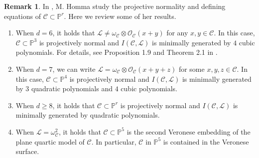 \documentclass[11pt,letterpaper,reqno]{amsart}
\theoremstyle{plain}
\theoremstyle{definition}
\newtheorem{remark}[theorem]{Remark}
\newtheorem{open problem}[theorem]{Open Problem}
\newtheorem{remark and notation}[theorem]{Remark and Notation}
\newtheorem{remark and definition}[theorem]{Remark and Definition}
\newtheorem{definition and notation}[theorem]{Definition and Notation}
\newtheorem{notation and convention}[theorem]{Notation and Convention}
\newtheorem{notation and remark}[theorem]{Notation and Remark}
\newtheorem{convention and notation}[theorem]{Convention and Notation}
\def \p {\mathbb{P}}
\begin{document}
\begin{remark}\label{rem:Homma's work}
In \cite{MR623440}, M. Homma study the projective normality and defining equations of $\mathcal{C} \subset \p^{r}$. Here we review some of her results.
\begin{enumerate}[\rm (1)]
    \item \label{rem:Homma1} When $d = 6$, it holds that $\mathcal{L} \neq \omega_{\mathcal{C}} \otimes \mathcal{O}_{\mathcal{C}} (x+y)$ for any $x,y \in \mathcal{C}$. In this case, $\mathcal{C} \subset \p^3$ is projectively normal and $I(\mathcal{C},\mathcal{L})$ is minimally generated by $4$ cubic polynomials. For details, see Proposition 1.9 and Theorem 2.1 in \cite{MR623440}.
    \item \label{rem:Homma2} When $d=7$, we can write $\mathcal{L} = \omega_{\mathcal{C}} \otimes \mathcal{O}_{\mathcal{C}} (x+y+z)$ for some $x,y,z \in \mathcal{C}$. In this case, $\mathcal{C} \subset \p^4$ is projectively normal and $I(\mathcal{C},\mathcal{L})$ is minimally generated by $3$ quadratic polynomials and $4$ cubic polynomials.
    \item \label{rem:Homma3} When $d \geq 8$, it holds that $\mathcal{C} \subset \p^{r}$ is projectively normal and $I(\mathcal{C},\mathcal{L})$ is minimally generated by quadratic polynomials.
    \item \label{rem:Homma4} When $\mathcal{L} = \omega_{\mathcal{C}} ^2$, it holds that $\mathcal{C} \subset \p^5$ is the second Veronese embedding of the plane quartic model of $\mathcal{C}$. In particular, $\mathcal{C}$ in $\p^5$ is contained in the Veronese surface. 
\end{enumerate}  
\end{remark}
\end{document}
